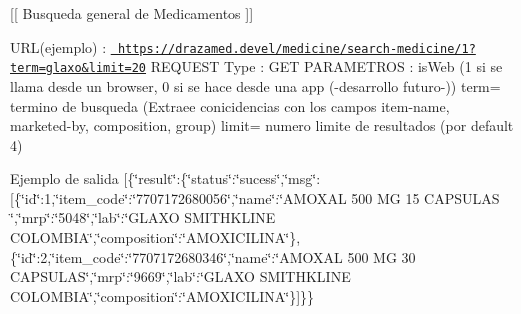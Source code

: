 \mbox{[}\mbox{[} Busqueda general de Medicamentos \mbox{]}\mbox{]}

U\+R\+L(ejemplo) \+: \href{https://drazamed.devel/medicine/search-medicine/1?term=glaxo&limit=20}{\texttt{ https\+://drazamed.\+devel/medicine/search-\/medicine/1?term=glaxo\&limit=20}} R\+E\+Q\+U\+E\+ST Type \+: G\+ET P\+A\+R\+A\+M\+E\+T\+R\+OS \+: is\+Web (1 si se llama desde un browser, 0 si se hace desde una app (-\/desarrollo futuro-\/)) term= termino de busqueda (Extraee conicidencias con los campos item-\/name, marketed-\/by, composition, group) limit= numero limite de resultados (por default 4)

Ejemplo de salida \mbox{[}\{\char`\"{}result\char`\"{}\+:\{\char`\"{}status\char`\"{}\+:\char`\"{}sucess\char`\"{},\char`\"{}msg\char`\"{}\+:\mbox{[}\{\char`\"{}id\char`\"{}\+:1,\char`\"{}item\+\_\+code\char`\"{}\+:\char`\"{}7707172680056\char`\"{},\char`\"{}name\char`\"{}\+:\char`\"{}\+A\+M\+O\+X\+A\+L 500 M\+G 15 C\+A\+P\+S\+U\+L\+A\+S \char`\"{},\char`\"{}mrp\char`\"{}\+:\char`\"{}5048\char`\"{},\char`\"{}lab\char`\"{}\+:\char`\"{}\+G\+L\+A\+X\+O S\+M\+I\+T\+H\+K\+L\+I\+N\+E C\+O\+L\+O\+M\+B\+I\+A\char`\"{},\char`\"{}composition\char`\"{}\+:\char`\"{}\+A\+M\+O\+X\+I\+C\+I\+L\+I\+N\+A\char`\"{}\},\{\char`\"{}id\char`\"{}\+:2,\char`\"{}item\+\_\+code\char`\"{}\+:\char`\"{}7707172680346\char`\"{},\char`\"{}name\char`\"{}\+:\char`\"{}\+A\+M\+O\+X\+A\+L 500 M\+G 30 C\+A\+P\+S\+U\+L\+A\+S\char`\"{},\char`\"{}mrp\char`\"{}\+:\char`\"{}9669\char`\"{},\char`\"{}lab\char`\"{}\+:\char`\"{}\+G\+L\+A\+X\+O S\+M\+I\+T\+H\+K\+L\+I\+N\+E C\+O\+L\+O\+M\+B\+I\+A\char`\"{},\char`\"{}composition\char`\"{}\+:\char`\"{}\+A\+M\+O\+X\+I\+C\+I\+L\+I\+N\+A\char`\"{}\}\mbox{]}\}\} 